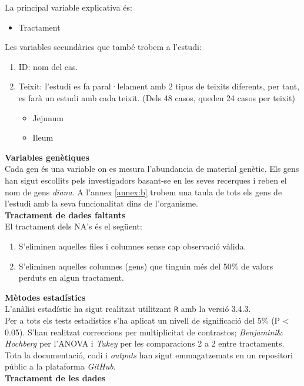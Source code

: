 \documentclass[english]{article}
\begin{document}
La principal variable explicativa és:
\begin{itemize}
  \item Tractament
\end{itemize}
Les variables secundàries que també trobem a l'estudi:
\begin{enumerate}
  \item ID: nom del cas.
  \item Teixit: l'estudi es fa paral·lelament amb 2 tipus de teixits diferents, per tant, es farà un estudi amb cada teixit. (Dels 48 casos, queden 24 casos per teixit)
  \begin{itemize}
    \item Jejunum
    \item Ileum
  \end{itemize}
\end{enumerate}
\noindent\textbf{Variables genètiques}\\

Cada gen és una variable on es mesura l'abundancia de material genètic. Els gens han sigut escollits pels investigadors basant-se en les seves recerques i reben el nom de gens \textit{diana}. A l'annex \ref{annex:b} trobem una taula de tots els gens de l'estudi amb la seva funcionalitat dins de l'organisme.\\

\noindent\textbf{Tractament de dades faltants}\\

El tractament dels NA’s és el següent:
\begin{enumerate}
\item S’eliminen aquelles files i columnes sense cap observació vàlida.
\item S’eliminen aquelles columnes (gens) que tinguin més del 50$\%$ de valors perduts en algun tractament.
\end{enumerate}
\clearpage
\noindent\textbf{Mètodes estadístics}\\

L'anàlisi estadístic ha sigut realitzat utilitzant \texttt{R} amb la versió 3.4.3.
\\

Per a tots els tests estadístics s'ha aplicat un nivell de significació del $5\%$ (P < 0.05). S'han realitzat correccions per multiplicitat de contrastos; \textit{Benjamini$\&$Hochberg} per l'ANOVA i \textit{Tukey} per les comparacions 2 a 2 entre tractaments.
\\

Tota la documentació, codi i \textit{outputs} han sigut emmagatzemats en un repositori públic a la plataforma \textit{GitHub}.\\
\newpage
\noindent\textbf{Tractament de les dades}\\
\end{document}
